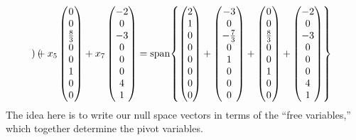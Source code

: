 \begin{example}
\begin{equation*}
\begin{pmatrix}
    \end{pmatrix} +
    x_5 \begin{pmatrix}
      0 \\ 0 \\ \frac{8}{3}\\ 0\\ 0\\ 1\\ 0\\ 0
    \end{pmatrix} +
    x_7 \begin{pmatrix}
      -2 \\ 0 \\ -3 \\ 0\\ 0\\ 0\\ 4\\ 1
    \end{pmatrix}
    = \vspan\pbrac{
      \begin{pmatrix}
        2 \\ 1 \\ 0\\ 0\\ 0\\ 0\\ 0\\ 0
      \end{pmatrix} +
      \begin{pmatrix}
        -3 \\ 0 \\ -\frac{7}{3}\\ 0\\ 1\\ 0\\ 0\\ 0
      \end{pmatrix} +
      \begin{pmatrix}
        0 \\ 0 \\ \frac{8}{3}\\ 0\\ 0\\ 1\\ 0\\ 0
      \end{pmatrix} +
      \begin{pmatrix}
        -2 \\ 0 \\ -3 \\ 0\\ 0\\ 0\\ 4\\ 1
      \end{pmatrix}
    }
  \end{equation*}
  The idea here is to write our null space vectors in terms of the ``free variables,'' which together determine the pivot variables.
\end{example}

